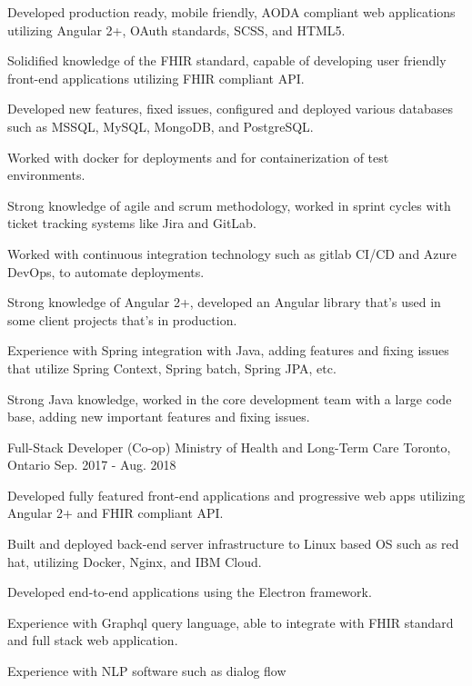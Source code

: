 \begin{cventries}
  \cventry
    {
      \begin{cvitems} %
        \item {Developed production ready, mobile friendly, AODA compliant web applications utilizing Angular 2+, OAuth standards, SCSS, and HTML5.}
        \item {Solidified knowledge of the FHIR standard, capable of developing user friendly front-end applications utilizing FHIR compliant API.}
        \item {Developed new features, fixed issues, configured and deployed various databases such as MSSQL, MySQL, MongoDB, and PostgreSQL.}
        \item {Worked with docker for deployments and for containerization of test environments.}
        \item {Strong knowledge of agile and scrum methodology, worked in sprint cycles with ticket tracking systems like Jira and GitLab.}
        \item {Worked with continuous integration technology such as gitlab CI/CD and Azure DevOps, to automate deployments.}
        \item {Strong knowledge of Angular 2+, developed an Angular library that's used in some client projects that's in production.}
        \item {Experience with Spring integration with Java, adding features and fixing issues that utilize Spring Context, Spring batch, Spring JPA, etc.}
        \item {Strong Java knowledge, worked in the core development team with a large code base, adding new important features and fixing issues.}
      \end{cvitems}
    }
  
    {Full-Stack Developer (Co-op)} %
    {Ministry of Health and Long-Term Care} %
    {Toronto, Ontario} %
    {Sep. 2017 - Aug. 2018} %
        \item {Developed fully featured front-end applications and progressive web apps utilizing Angular 2+ and FHIR compliant API.}
        \item {Built and deployed back-end server infrastructure to Linux based OS such as red hat, utilizing Docker, Nginx, and IBM Cloud.}
        \item {Developed end-to-end applications using the Electron framework.}
        \item {Experience with Graphql query language, able to integrate with FHIR standard and full stack web application.}
        \item {Experience with NLP software such as dialog flow}
\end{cventries}
